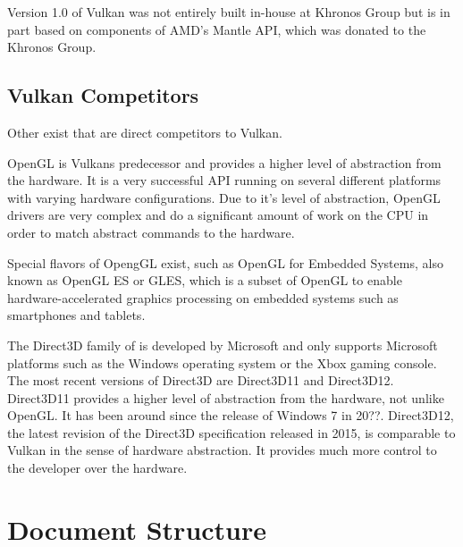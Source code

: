     Version 1.0 of Vulkan was not entirely built in-house at Khronos Group but is in part based on components of AMD's Mantle API, which was donated to the Khronos Group.


    \subsection{Vulkan Competitors}

      Other  exist that are direct competitors to Vulkan.

      OpenGL is Vulkans predecessor and provides a higher level of abstraction from the hardware. It is a very successful API running on several different platforms with varying hardware configurations. Due to it's level of abstraction, OpenGL drivers are very complex and do a significant amount of work on the CPU in order to match abstract commands to the hardware.

      Special flavors of OpengGL exist, such as OpenGL for Embedded Systems, also known as OpenGL ES or GLES, which is a subset of OpenGL to enable hardware-accelerated graphics processing on embedded systems such as smartphones and tablets.

      The Direct3D family of  is developed by Microsoft and only supports Microsoft platforms such as the Windows operating system or the Xbox gaming console. The most recent versions of Direct3D are Direct3D11 and Direct3D12. Direct3D11 provides a higher level of abstraction from the hardware, not unlike OpenGL. It has been around since the release of Windows 7 in 20??. Direct3D12, the latest revision of the Direct3D specification released in 2015, is comparable to Vulkan in the sense of hardware abstraction. It provides much more control to the developer over the hardware.





  \section{Document Structure}

    \tbd
